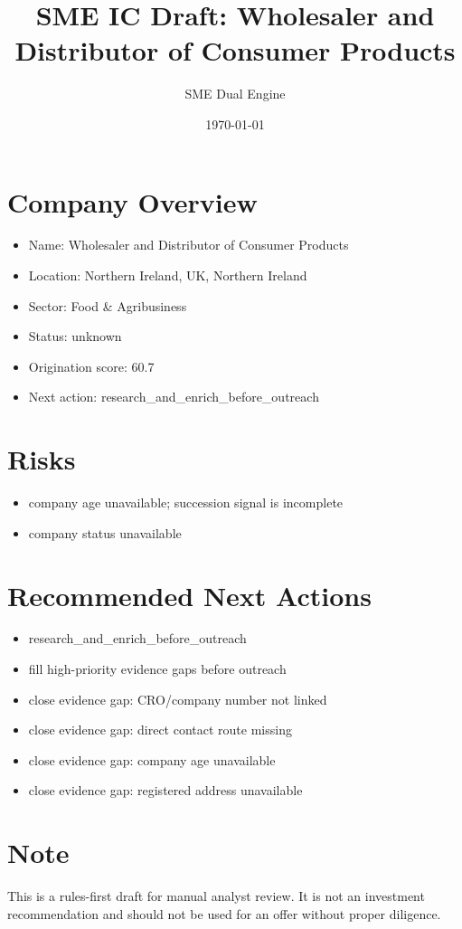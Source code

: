 \documentclass[11pt,a4paper]{article}
\title{SME IC Draft: Wholesaler and Distributor of Consumer Products}
\author{SME Dual Engine}
\date{\today}
\begin{document}
\maketitle
\section*{Company Overview}
\begin{itemize}[leftmargin=1.4em]
\item Name: Wholesaler and Distributor of Consumer Products
\item Location: Northern Ireland, UK, Northern Ireland
\item Sector: Food \& Agribusiness
\item Status: unknown
\item Origination score: 60.7
\item Next action: research\_and\_enrich\_before\_outreach
\end{itemize}
\section*{Risks}
\begin{itemize}[leftmargin=1.4em]
\item company age unavailable; succession signal is incomplete
\item company status unavailable
\end{itemize}
\section*{Recommended Next Actions}
\begin{itemize}[leftmargin=1.4em]
\item research\_and\_enrich\_before\_outreach
\item fill high-priority evidence gaps before outreach
\item close evidence gap: CRO/company number not linked
\item close evidence gap: direct contact route missing
\item close evidence gap: company age unavailable
\item close evidence gap: registered address unavailable
\end{itemize}
\section*{Note}
This is a rules-first draft for manual analyst review. It is not an investment
recommendation and should not be used for an offer without proper diligence.
\end{document}
